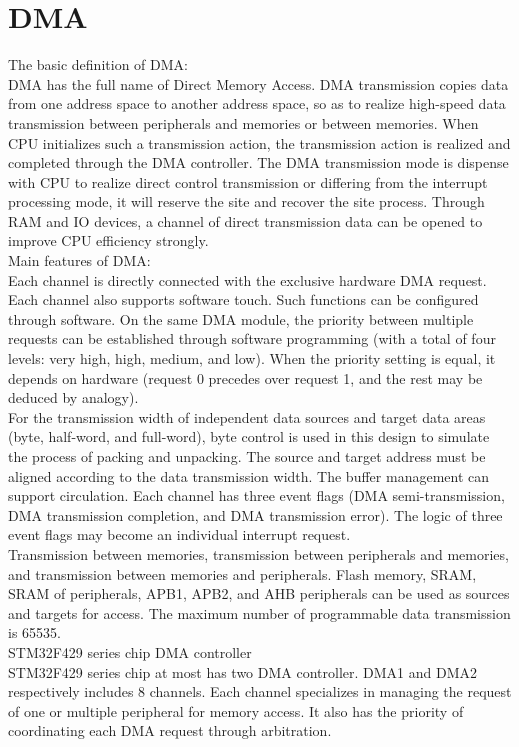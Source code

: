 \section{DMA}
\label{sec:DMA}
The basic definition of DMA: 
\\
DMA has the full name of Direct Memory Access. 
DMA transmission copies data from one address space to another address space, so as to realize high-speed data transmission between peripherals and memories or between memories. When CPU initializes such a transmission action, the transmission action is realized and completed through the DMA controller. The DMA transmission mode is dispense with CPU to realize direct control transmission or differing from the interrupt processing mode, it will reserve the site and recover the site process. Through RAM and IO devices, a channel of direct transmission data can be opened to improve CPU efficiency strongly. 
\\
Main features of DMA:
\\
Each channel is directly connected with the exclusive hardware DMA request. Each channel also supports software touch. Such functions can be configured through software. 
On the same DMA module, the priority between multiple requests can be established through software programming (with a total of four levels: very high, high, medium, and low). When the priority setting is equal, it depends on hardware (request 0 precedes over request 1, and the rest may be deduced by analogy). 
\\
For the transmission width of independent data sources and target data areas (byte, half-word, and full-word), byte control is used in this design to simulate the process of packing and unpacking. The source and target address must be aligned according to the data transmission width. 
The buffer management can support circulation. 
Each channel has three event flags (DMA semi-transmission, DMA transmission completion, and DMA transmission error). The logic of three event flags may become an individual interrupt request. 
\\
Transmission between memories, transmission between peripherals and memories, and transmission between memories and peripherals. 
Flash memory, SRAM, SRAM of peripherals, APB1, APB2, and AHB peripherals can be used as sources and targets for access. 
The maximum number of programmable data transmission is 65535. 
\\
STM32F429 series chip DMA controller 
\\
STM32F429 series chip at most has two DMA controller. DMA1 and DMA2 respectively includes 8 channels. Each channel specializes in managing the request of one or multiple peripheral for memory access. It also has the priority of coordinating each DMA request through arbitration. 

